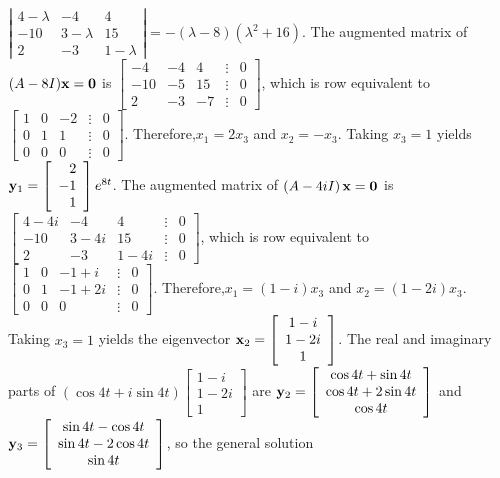 \documentclass[dvips]{book}
\renewcommand{\exer}[1]{\par\medskip\;\noindent{\color{red}\bf #1.}}
\numberwithin{example}{section}
\numberwithin{equation}{section}
\numberwithin{theorem}{section}
\numberwithin{table}{section}
\numberwithin{figure}{section}
\newcommand{\threecol}[3]{\left[\begin{array}{r}#1\\#2\\#3\end{array}\right]}
\begin{document}
\exer{10.6.24}
$\left|\begin{array}{ccc}4-\lambda&-4&4\\-10&3-\lambda&15\\2
&-3&1-\lambda\end{array}\right|=-(\lambda-8)(\lambda^2+16)$.
 The augmented matrix of $(A-8I){\bf x=0}$ is
$\left[\begin{array}{rrrcr}-4&-4&4&\vdots&0\\-10&-5&15&\vdots&0\\
2&-3&-7&\vdots&0\end{array}\right]$,
which is row equivalent to
$\left[\begin{array}{rrrcr} 1&0&-2&\vdots&0\\ 0&1&1&
\vdots&0\\ 0&0&0&\vdots&0\end{array}\right]$.
Therefore,$x_1=2x_3$ and $x_2=-x_3$. Taking $x_3=1$ yields
${\bf y}_1=\threecol2{-1}1e^{8t}$.
The augmented matrix of
$\left(A-4iI\right){\bf x=0}$ is
$\left[\begin{array}{ccccr}4-4i&-4&4&\vdots&0\\-10&3-4i&15&\vdots&0\\
2&-3&1-4i&\vdots&0\end{array}\right]$,
which is row equivalent to
$\left[\begin{array}{ccccc} 1&0&-1+i&\vdots&0\\
0&1&-1+2i&\vdots&0\\ 0&0&0&\vdots&0\end{array}\right]$.
Therefore,$x_1=(1-i)x_3$ and $x_2=(1-2i)x_3$.
Taking $x_3=1$ yields the eigenvector
${\bf x}_2=\left[\begin{array}{c}1-i\\1-2i\\1\end{array}\right]$.
The real and imaginary parts of
$(\cos4t+i\sin
4t)\left[\begin{array}{c}1-i\\1-2i\\1\end{array}\right]$
are ${\bf y}_2=\left[\begin{array}{c}\cos4t+\sin4t
\\\cos4t+2\sin4t\\\cos4t\end{array}\right]$ and
${\bf y}_3=\left[\begin{array}{c}\sin4t-\cos4t
\\\sin4t-2\cos4t\\\sin4t\end{array}\right]$, so the general solution
\end{document}
